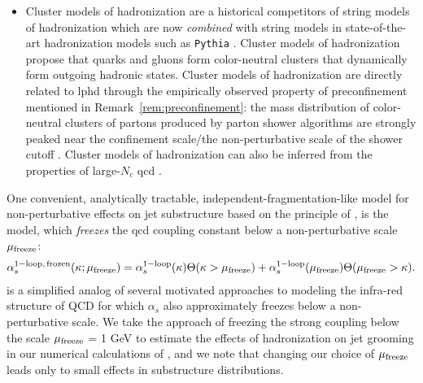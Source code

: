 \begin{subappendices}
\begin{itemize}
    \item

        Cluster models of hadronization are a historical competitors of string models of hadronization \cite{} which are now \textit{combined} with string models in state-of-the-art hadronization models such as \texttt{Pythia} \cite{}.
        Cluster models of hadronization propose that quarks and gluons form color-neutral clusters that dynamically form outgoing hadronic states.
        Cluster models of hadronization are directly related to \gls{lphd} through the empirically observed property of \gls{preconfinement} mentioned in Remark~\ref{rem:preconfinement}:
        the mass distribution of color-neutral clusters of partons produced by parton shower algorithms are strongly peaked near the confinement scale/the non-perturbative scale of the shower cutoff \cite{}.
        Cluster models of hadronization can also be inferred from the properties of large-\(N_c\) \gls{qcd} \cite{Hoche:2014rga}.
\end{itemize}

One convenient, analytically tractable, independent-fragmentation-like model for non-perturbative effects on jet substructure based on the principle of , is the  model, which \textit{freezes} the \gls{qcd} coupling constant below a non-perturbative scale \(\mu_{\rm freeze}\):
\begin{align}
    \alpha^{\rm 1-loop,\,frozen}_s(\kappa; \mu_{\rm freeze})
    =
    \alpha^{\rm 1-loop}_s(\kappa)
    \Theta(\kappa > \mu_{\rm freeze})
    +
    \alpha^{\rm 1-loop}_s(\mu_{\rm freeze})
    \Theta(\mu_{\rm freeze} > \kappa)
    .
    \label{eq:frozen-coupling}
\end{align}
%
 is a simplified analog of several motivated approaches to modeling the infra-red structure of QCD for which \(\alpha_s\) also approximately freezes below a non-perturbative scale.
%
We take the approach of freezing the strong coupling below the scale \(\mu_{\rm freeze}\) = 1 GeV to estimate the effects of hadronization on jet grooming in our numerical calculations of , and we note that changing our choice of \(\mu_{\rm freeze}\) leads only to small effects in substructure distributions.



\end{subappendices}
